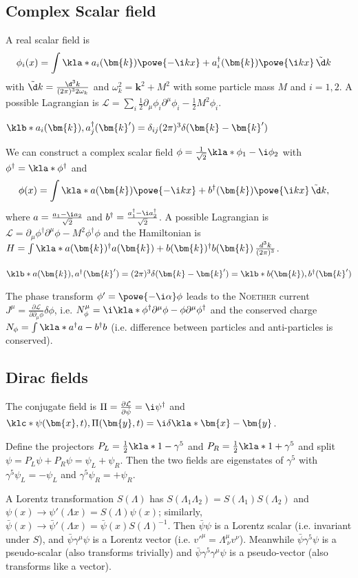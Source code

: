 \documentclass[english, parskip=full]{scrbook}
\newcommand{\definition}[2]{\begin{tcolorbox}[colback=colorbackgrounddefinition,colframe=colordefinition, breakable,enhanced,title=\textbf{#1}.]#2\end{tcolorbox}}
\newcommand{\note}[1]{\begin{tcolorbox}[colback=colorbackgroundnote,colframe=colornote, breakable,enhanced]#1\end{tcolorbox}}
\begin{document}
\subsection{Complex Scalar field}
A real scalar field is
\begin{align}
\phi_i(x) &= \int \kla*{a_i(\bm{k}) \powe{-\i kx} + a_i^\dagger(\bm{k}) \powe{\i kx}} \,\tilde{\d} k
\end{align}
with $\tilde{\d}k = \frac{\d^3k}{(2\pi)^3 2\omega_k}$ and $\omega_k^2 = \bm{k}^2 + M^2$ with some particle mass $M$ and $i=1,2$.
A possible Lagrangian is $\mathcal{L} = \sum_i \frac{1}{2} \partial_\mu\phi_i \partial^\mu\phi_i - \frac{1}{2} M^2\phi_i$.
\note{$\klb*{a_i(\bm{k}),a_j^\dagger(\bm{k}')} = \delta_{ij} (2\pi)^3 \delta(\bm{k}-\bm{k}')$}
We can construct a complex scalar field $\phi=\frac{1}{\sqrt{2}} \kla*{\phi_1 - \i \phi_2}$ with $\phi^\dagger = \kla*{\phi}^\dagger$ and
\begin{align}
\phi(x) &= \int \kla*{a(\bm{k}) \powe{-\i kx} + b^\dagger(\bm{k}) \powe{\i kx}} \,\tilde{\d} k,
\end{align}
where $a=\frac{a_1-\i a_2}{\sqrt{2}}$ and $b^\dagger=\frac{a_1^\dagger - \i a_2^\dagger}{\sqrt{2}}$.
A possible Lagrangian is $\mathcal{L} = \partial_\mu\phi^\dagger \partial^\mu\phi - M^2\phi^\dagger \phi$ and the Hamiltonian is $H=\int \kla*{a(\bm{k})^\dagger a(\bm{k}) + b(\bm{k})^\dagger b(\bm{k})}\,\frac{d^3k}{(2\pi)^3}$.
\note{$\klb*{a(\bm{k}),a^\dagger(\bm{k}')} = (2\pi)^3 \delta(\bm{k}-\bm{k}') = \klb*{b(\bm{k}),b^\dagger(\bm{k}')}$}
The phase transform $\phi'=\powe{-\i\alpha}\phi$ leads to the \textsc{Noether} current $J^\mu=\frac{\partial\mathcal{L}}{\partial \partial_\mu\phi} \delta \phi$, i.e. $N_\phi^\mu = \i \kla*{\phi^\dagger \partial^\mu \phi - \phi \partial^\mu \phi^\dagger}$ and the conserved charge $N_\phi = \int \kla*{a^\dagger a - b^\dagger b}$ (i.e. difference between particles and anti-particles is conserved).
\subsection{Dirac fields}
The conjugate field is $\Pi=\frac{\partial\mathcal{L}}{\partial \dot{\psi}} = \i \psi^\dagger$ and $\klc*{\psi(\bm{x},t),\Pi(\bm{y},t)} = \i\delta\kla*{\bm{x} - \bm{y}}$.
\definition{Chirality}{
Define the projectors $P_L = \frac{1}{2}\kla*{1 - \gamma^5}$ and $P_R= \frac{1}{2}\kla*{1 + \gamma^5}$ and split $\psi=P_L\psi + P_R\psi = \psi_L + \psi_R$.
Then the two fields are eigenstates of $\gamma^5$ with $\gamma^5\psi_L=-\psi_L$ and $\gamma^5\psi_R=+\psi_R$.
}
A Lorentz transformation $S(\Lambda)$ has $S(\Lambda_1\Lambda_2) = S(\Lambda_1)S(\Lambda_2)$ and $\psi(x)\rightarrow \psi'(\Lambda x) = S(\Lambda) \psi(x)$; similarly, $\bar{\psi}(x) \rightarrow \bar{\psi}'(\Lambda x) = \bar{\psi}(x) S(\Lambda)^{-1}$.
Then $\bar{\psi}\psi$ is a Lorentz scalar (i.e. invariant under $S$), and $\bar{\psi} \gamma^\mu \psi$ is a Lorentz vector (i.e. $v'^\mu = \Lambda^\mu_{\ \nu} v^\nu$).
Meanwhile $\bar{\psi}\gamma^5\psi$ is a pseudo-scalar (also transforms trivially) and $\bar{\psi}\gamma^5\gamma^\mu\psi$ is a pseudo-vector (also transforms like a vector).
\end{document}

